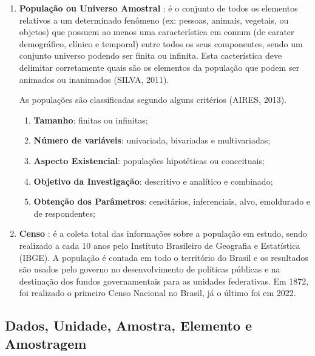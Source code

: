 \begin{enumerate}
\item \textbf{População ou Universo Amostral} : é o conjunto de todos os elementos relativos
a um determinado fenômeno (ex: pessoas, animais, vegetais, ou objetos) que possuem ao menos uma característica em comum (de carater demográfico, clínico e temporal) entre todos os seus componentes, sendo um conjunto universo podendo ser finita ou infinita. Esta cacterística deve delimitar corretamente quais são os elementos da população que podem ser animados ou inanimados (SILVA, 2011).\vskip0.3cm

As populações são classificadas segundo alguns critérios (AIRES, 2013).

\begin{enumerate}
\item \textbf{Tamanho}: finitas ou infinitas;
\item \textbf{Número de variáveis}: univariada, bivariadas e multivariadas;
\item \textbf{Aspecto Existencial}: populações hipotéticas ou conceituais;
\item \textbf{Objetivo da Investigação}: descritivo e analítico e combinado;
\item \textbf{Obtenção dos Parâmetros}: censitários, inferenciais, alvo, e\-mol\-du\-ra\-do e de respondentes;
\end{enumerate}

\item \textbf{Censo} : é a coleta total das informações sobre a
população em estudo, sendo realizado a cada 10 anos pelo Instituto
Brasileiro de Geografia e Estatística (IBGE). A população é contada
em todo o território do Brasil e os resultados são usados
pelo governo no desenvolvimento de políticas públicas e na
destinação dos fundos governamentais para as unidades federativas.
Em 1872, foi realizado o primeiro Censo Nacional no Brasil, já o último foi em 2022.
\end{enumerate}

\newpage
\subsection{Dados, Unidade, Amostra, Elemento e Amostragem}

